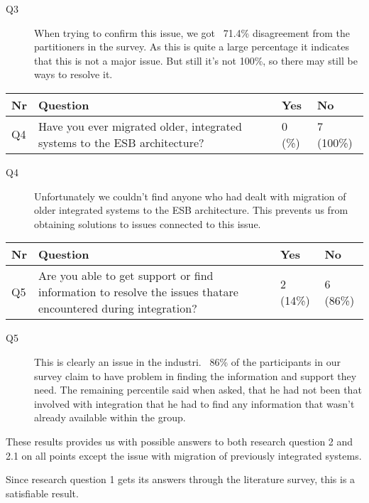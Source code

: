 \documentclass{llncs}
\begin{document}
\begin{description}
\item[Q3] When trying to confirm this issue, we got ~71.4\% disagreement from the partitioners in the survey. As this is quite a large percentage it indicates that this is not a major issue. But still it’s not 100\%, so there may still be ways to resolve it.
\end{description}

\begin{tabular}{ | l | p{9cm} | l | l |}
\hline
Nr & Question & Yes & No \\ \hline
Q4 & Have you ever migrated older, integrated systems to the ESB architecture? & 0 (\%) & 7 (100\%) \\ \hline
\end{tabular}

\begin{description}
\item[Q4]  Unfortunately we couldn’t find anyone who had dealt with migration of older integrated systems to the ESB architecture. This prevents us from obtaining solutions to issues connected to this issue.
\end{description}

\begin{tabular}{ | l | p{9cm} | l | l |}
\hline
Nr & Question & Yes & No\\ \hline
Q5 & Are you able to get support or find information to resolve the issues thatare encountered during integration? & 2 (14\%) & 6 (86\%)\\ \hline
\end{tabular}

\begin{description}
\item[Q5] This is clearly an issue in the industri. ~86\% of the participants in our survey claim to have problem in finding the information and support they need. The remaining percentile said when asked, that he had not been that involved with integration that he had to find any information that wasn't already available within the group.
\end{description}

These results provides us with possible answers to both research question 2 and 2.1 on all points except the issue with migration of previously integrated systems.

Since research question 1 gets its answers through the literature survey, this is a satisfiable result.
\end{document}
